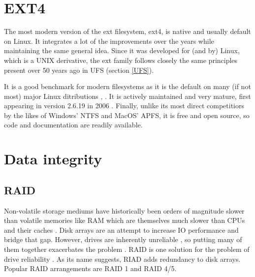     \section{EXT4}

        The most modern version of the ext filesystem, ext4, is native and
        usually default on Linux. It integrates a lot of the improvements over
        the years while maintaining the same general idea. Since it was
        developed for (and by) Linux, which is a UNIX derivative, the ext
        family follows closely the same principles present over 50 years ago in
        UFS (section \ref{UFS}).

        It is a good benchmark for modern filesystems as it is the default on
        many (if not most) major Linux ditributions
        \cite{https://wiki.debian.org/FileSystem},
        \cite{https://access.redhat.com/documentation/en-us/red_hat_enterprise_linux/6/html/performance_tuning_guide/s-storage-fs}.
        It is actively maintained
        \cite{https://www.spinics.net/lists/linux-ext4/} and very mature, first
        appearing in version 2.6.19 in 2006
        \cite{http://www.h-online.com/open/features/Kernel-Log-Higher-and-Further-The-innovations-of-Linux-2-6-28-746805.html}.
        Finally, unlike its most direct competitiors by the likes of Windows'
        NTFS and MacOS' APFS, it is free and open source, so code and
        documentation are readily available.
    \section{Data integrity}

        \subsection{RAID}

            Non-volatile storage mediums have historically been orders of
            magnitude slower than volatile memories like RAM which are
            themselves much slower than CPUs and their caches \cite{raid has a
            Frank87, Stevens81}. Disk arrays are an attempt to increase IO
            performance and bridge that gap. However, drives are inherently
            unreliable \cite{pls (backblaze is a killer source)}, so putting
            many of them together exacerbates the problem \cite{maybe also
            raid. he has an MTTF caluclation}.  RAID is one solution for the
            problem of drive reliability \cite{RAID}. As its name suggests,
            RIAD adds redundancy to disk arrays. Popular RAID arrangements are
            RAID 1 and RAID 4/5.

